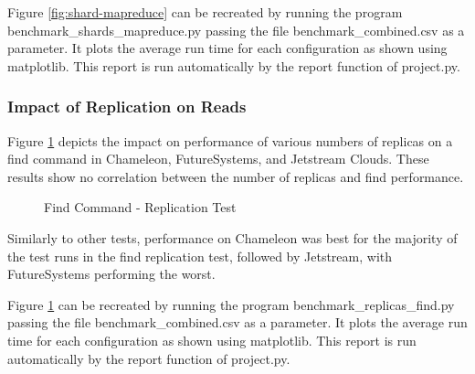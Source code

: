 \documentclass[9pt,twocolumn,twoside]{../../styles/osajnl}
\begin{document}
Figure \ref{fig:shard-mapreduce} can be recreated by running the
program benchmark\_shards\_mapreduce.py passing the file
benchmark\_combined.csv as a parameter. It plots the average run time
for each configuration as shown using matplotlib. This report is run
automatically by the report function of project.py.

\subsubsection{Impact of Replication on Reads}



Figure \ref{fig:replica-find} depicts the impact on performance of
various numbers of replicas on a find command in Chameleon,
FutureSystems, and Jetstream Clouds. These results show no correlation
between the number of replicas and find performance.

\begin{figure}[htbp]
\centering
{}
\caption{Find Command - Replication Test}
\label{fig:replica-find}
\end{figure}

Similarly to other tests, performance on Chameleon was best for the
majority of the test runs in the find replication test, followed by
Jetstream, with FutureSystems performing the worst.

Figure \ref{fig:replica-find} can be recreated by running the program
benchmark\_replicas\_find.py passing the file benchmark\_combined.csv
as a parameter. It plots the average run time for each configuration
as shown using matplotlib. This report is run automatically by the
report function of project.py.
\end{document}
